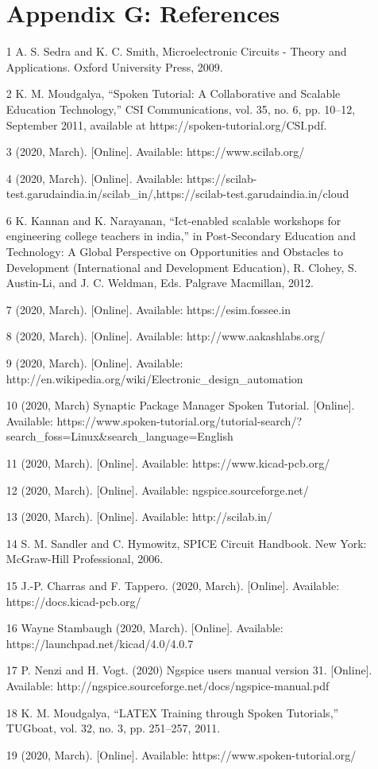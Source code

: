 \begin{enumerate}
\section {Appendix G: References}
\item [1] A. S. Sedra and K. C. Smith, Microelectronic Circuits - Theory and Applications. Oxford University Press, 2009. 
\item [2] K. M. Moudgalya, “Spoken Tutorial: A Collaborative and Scalable Education Technology,” CSI Communications, vol. 35, no. 6, pp. 10–12, September 2011, available at https://spoken-tutorial.org/CSI.pdf. 
\item [3] (2020, March). [Online]. Available: https://www.scilab.org/ 
\item [4] (2020, March). [Online]. Available: https://scilab-test.garudaindia.in/scilab\_in/,https://scilab-test.garudaindia.in/cloud 
\item [6]  K. Kannan and K. Narayanan, “Ict-enabled scalable workshops for engineering college teachers in india,” in Post-Secondary Education and Technology: A Global Perspective on Opportunities and Obstacles to Development (International and Development Education), R. Clohey, S. Austin-Li, and J. C. Weldman, Eds. Palgrave Macmillan, 2012. 
\item [7]  (2020, March). [Online]. Available: https://esim.fossee.in 
\item [8] (2020, March). [Online]. Available: http://www.aakashlabs.org/ 
\item [9] (2020, March). [Online]. Available: http://en.wikipedia.org/wiki/Electronic\_design\_automation
\item [10] (2020, March) Synaptic Package Manager Spoken Tutorial. [Online]. Available: https://www.spoken-tutorial.org/tutorial-search/?search\_foss=Linux&search\_language=English 
\item [11] (2020, March). [Online]. Available: https://www.kicad-pcb.org/
\item [12] (2020, March). [Online]. Available: ngspice.sourceforge.net/
\item [13] (2020, March). [Online]. Available: http://scilab.in/ 
\item [14]   S. M. Sandler and C. Hymowitz, SPICE Circuit Handbook. New York: McGraw-Hill Professional, 2006. 
\item [15]   J.-P. Charras and F. Tappero. (2020, March). [Online]. Available: https://docs.kicad-pcb.org/
\item [16] Wayne Stambaugh (2020, March). [Online]. Available: https://launchpad.net/kicad/4.0/4.0.7 
\item   [17]   P. Nenzi and H. Vogt. (2020) Ngspice users manual version 31. [Online]. Available: http://ngspice.sourceforge.net/docs/ngspice-manual.pdf 
\item [18]   K. M. Moudgalya, “LATEX Training through Spoken Tutorials,” TUGboat, vol. 32, no. 3, pp. 251–257, 2011. 
\item [19]   (2020, March). [Online]. Available: https://www.spoken-tutorial.org/ 
\end{enumerate}
